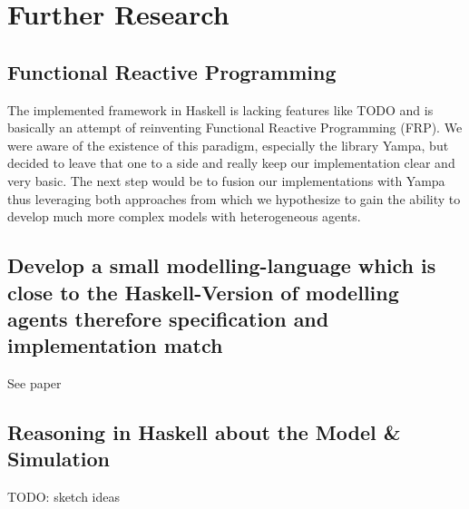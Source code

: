 \section{Further Research}

\subsection{Functional Reactive Programming}
The implemented framework in Haskell is lacking features like TODO and is basically an attempt of reinventing Functional Reactive Programming (FRP). We were aware of the existence of this paradigm, especially the library Yampa, but decided to leave that one to a side and really keep our implementation clear and very basic. The next step would be to fusion our implementations with Yampa thus leveraging both approaches from which we hypothesize to gain the ability to develop much more complex models with heterogeneous agents.

\subsection{Develop a small modelling-language which is close to the Haskell-Version of modelling agents therefore specification and implementation match}
See paper

\subsection{Reasoning in Haskell about the Model \& Simulation}
TODO: sketch ideas